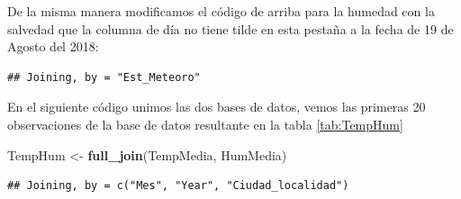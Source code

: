 \documentclass[]{book}
\newenvironment{Shaded}{\begin{snugshade}}{\end{snugshade}}
\newcommand{\DataTypeTok}[1]{\textcolor[rgb]{0.13,0.29,0.53}{#1}}
\newcommand{\DecValTok}[1]{\textcolor[rgb]{0.00,0.00,0.81}{#1}}
\newcommand{\KeywordTok}[1]{\textcolor[rgb]{0.13,0.29,0.53}{\textbf{#1}}}
\newcommand{\NormalTok}[1]{#1}
\newcommand{\OperatorTok}[1]{\textcolor[rgb]{0.81,0.36,0.00}{\textbf{#1}}}
\newcommand{\StringTok}[1]{\textcolor[rgb]{0.31,0.60,0.02}{#1}}
\begin{document}
De la misma manera modificamos el código de arriba para la humedad con
la salvedad que la columna de día no tiene tilde en esta pestaña a la
fecha de 19 de Agosto del 2018:

\begin{verbatim}
## Joining, by = "Est_Meteoro"
\end{verbatim}

\begin{Shaded}
\end{Shaded}

En el siguiente código unimos las dos bases de datos, vemos las primeras
20 observaciones de la base de datos resultante en la tabla
\ref{tab:TempHum}

\begin{Shaded}
\begin{Highlighting}[]
\NormalTok{TempHum <-}\StringTok{ }\KeywordTok{full_join}\NormalTok{(TempMedia, HumMedia)}
\end{Highlighting}
\end{Shaded}

\begin{verbatim}
## Joining, by = c("Mes", "Year", "Ciudad_localidad")
\end{verbatim}
\end{document}
